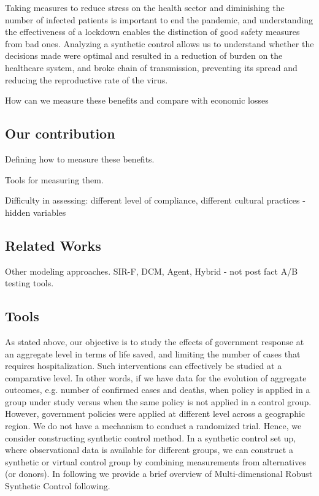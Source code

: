 \documentclass[preprint,authoryear,12pt]{elsarticle}
\begin{document}
	Taking measures to reduce stress on the health sector and diminishing the number of infected patients is important to end the pandemic, and understanding the effectiveness of a lockdown enables the distinction of good safety measures from bad ones. Analyzing a synthetic control allows us to understand whether the decisions made were optimal and resulted in a reduction of burden on the healthcare system, and broke chain of transmission, preventing its spread and reducing the reproductive rate of the virus.
	
	How can we measure these benefits and compare with economic losses
	
	\subsection{Our contribution}
	Defining how to measure these benefits.
	
	Tools for measuring them.
	
	
	Difficulty in assessing: different level of compliance, different cultural practices - hidden variables
	
	\subsection{Related Works}
	Other modeling approaches. SIR-F, DCM, Agent, Hybrid - not post fact A/B testing tools.
	
	\subsection{Tools}
As stated above, our objective is to study the effects of government response at an aggregate level in terms of life saved, and limiting the number of cases that requires hospitalization. Such interventions can effectively be studied at a comparative level. In other words, if we have data for the evolution of aggregate outcomes, e.g. number of confirmed cases and deaths, when policy is applied in a group under study versus when the same policy is not applied in a control group. However, government policies were applied at different level across a geographic region.  We do not have a mechanism to conduct a randomized trial. Hence, we consider constructing synthetic control method\cite{ap08746, JMLR18, AMSS19}. In a synthetic control set up, where observational data is available for different groups, we can construct a synthetic or virtual control group by combining measurements from alternatives (or donors). In following we provide a brief overview of Multi-dimensional Robust Synthetic Control following\cite{AMSS19}.\par
\end{document}
